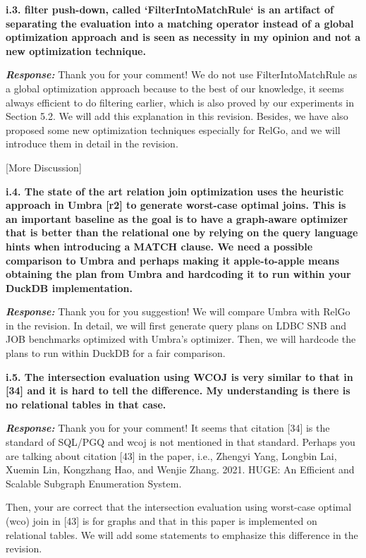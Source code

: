 \textbf{i.3. filter push-down, called `FilterIntoMatchRule` is an artifact of separating the evaluation into a matching operator instead of a global optimization approach and is seen as necessity in my opinion and not a new optimization technique.}

\textbf{\textit{Response: }}
Thank you for your comment! We do not use FilterIntoMatchRule as a global optimization approach because to the best of our knowledge, it seems always efficient to do filtering earlier, which is also proved by our experiments in Section 5.2. We will add this explanation in this revision.
Besides, we have also proposed some new optimization techniques especially for RelGo, and we will introduce them in detail in the revision.

[More Discussion]

\textbf{
i.4. The state of the art relation join optimization uses the heuristic approach in Umbra [r2] to generate worst-case optimal joins. This is an important baseline as the goal is to have a graph-aware optimizer that is better than the relational one by relying on the query language hints when introducing a MATCH clause. We need a possible comparison to Umbra and perhaps making it apple-to-apple means obtaining the plan from Umbra and hardcoding it to run within your DuckDB implementation.
}

\textbf{\textit{Response: }}
Thank you for you suggestion! We will compare Umbra with RelGo in the revision. In detail, we will first generate query plans on LDBC SNB and JOB benchmarks optimized with Umbra's optimizer. Then, we will hardcode the plans to run within DuckDB for a fair comparison.


\textbf{
i.5. The intersection evaluation using WCOJ is very similar to that in [34] and it is hard to tell the difference. My understanding is there is no relational tables in that case.}

\textbf{\textit{Response: }}
Thank you for your comment! It seems that citation [34] is the standard of SQL/PGQ and wcoj is not mentioned in that standard.
Perhaps you are talking about citation [43] in the paper, i.e., Zhengyi Yang, Longbin Lai, Xuemin Lin, Kongzhang Hao, and Wenjie Zhang.
2021. HUGE: An Efficient and Scalable Subgraph Enumeration System.

Then, your are correct that the intersection evaluation using worst-case optimal (wco) join in [43] is for graphs and that in this paper is implemented on relational tables.
We will add some statements to emphasize this difference in the revision.


